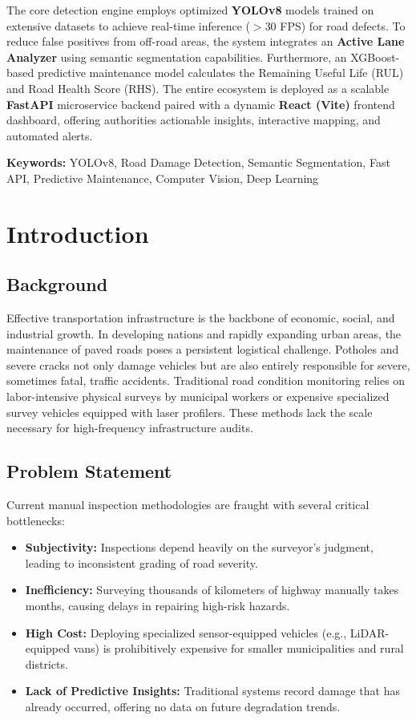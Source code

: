 \documentclass[12pt,a4paper]{report}
\begin{document}
The core detection engine employs optimized \textbf{YOLOv8} models trained on extensive datasets to achieve real-time inference ($>30$ FPS) for road defects. To reduce false positives from off-road areas, the system integrates an \textbf{Active Lane Analyzer} using semantic segmentation capabilities. Furthermore, an XGBoost-based predictive maintenance model calculates the Remaining Useful Life (RUL) and Road Health Score (RHS). The entire ecosystem is deployed as a scalable \textbf{FastAPI} microservice backend paired with a dynamic \textbf{React (Vite)} frontend dashboard, offering authorities actionable insights, interactive mapping, and automated alerts.

\textbf{Keywords:} YOLOv8, Road Damage Detection, Semantic Segmentation, Fast API, Predictive Maintenance, Computer Vision, Deep Learning

\tableofcontents
\listoffigures
\listoftables
\newpage

\chapter{Introduction}

\section{Background}
Effective transportation infrastructure is the backbone of economic, social, and industrial growth. In developing nations and rapidly expanding urban areas, the maintenance of paved roads poses a persistent logistical challenge. Potholes and severe cracks not only damage vehicles but are also entirely responsible for severe, sometimes fatal, traffic accidents. Traditional road condition monitoring relies on labor-intensive physical surveys by municipal workers or expensive specialized survey vehicles equipped with laser profilers. These methods lack the scale necessary for high-frequency infrastructure audits.

\section{Problem Statement}
Current manual inspection methodologies are fraught with several critical bottlenecks:
\begin{itemize}
    \item \textbf{Subjectivity:} Inspections depend heavily on the surveyor's judgment, leading to inconsistent grading of road severity.
    \item \textbf{Inefficiency:} Surveying thousands of kilometers of highway manually takes months, causing delays in repairing high-risk hazards.
    \item \textbf{High Cost:} Deploying specialized sensor-equipped vehicles (e.g., LiDAR-equipped vans) is prohibitively expensive for smaller municipalities and rural districts.
    \item \textbf{Lack of Predictive Insights:} Traditional systems record damage that has already occurred, offering no data on future degradation trends.
\end{itemize}
\end{document}
